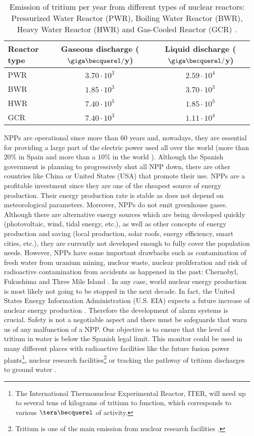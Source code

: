\begin{table}[htbp]
\centering{}%
\begin{tabular}{lcc}
\toprule 
Reactor type & Gaseous discharge ($\giga\becquerel/$y) & Liquid discharge ($\giga\becquerel/$y)\tabularnewline
\midrule
\midrule 
PWR & $3.70\cdot 10^{3}$ & $2.59\cdot 10^{4}$ \tabularnewline
BWR & $1.85\cdot 10^{3}$ & $3.70\cdot 10^{3}$ \tabularnewline
HWR & $7.40\cdot 10^{5}$ & $1.85\cdot 10^{5}$ \tabularnewline
GCR & $7.40\cdot 10^{3}$ & $1.11\cdot 10^{4}$ \tabularnewline
\bottomrule
\end{tabular}
\caption{Emission of tritium per year from different types of nuclear reactors: Pressurized Water Reactor (PWR), Boiling Water Reactor (BWR), Heavy Water Reactor (HWR) and Gas-Cooled Reactor (GCR) \cite{CommonEmissionTritium}.}
\label{tab:TritiumEmisionsNPPs}
\end{table}

NPPs are operational since more than 60 years and, nowadays, they are essential for providing a large part of the electric power used all over the world (more than $20\%$ in Spain \cite{PercentageEnergySpain} and more than a $10\%$ in the world \cite{PercentageEnergyWorld}). Although the Spanish government is planning to progressively shut all NPP down, there are other countries like China \cite{60ReactorsChina} or United States (USA) \cite{35MillionsUSA} that promote their use. NPPs are a profitable investment since they are one of the cheapest source of energy production. Their energy production rate is stable as does not depend on meteorological parameters. Moreover, NPPs do not emit greenhouse gases. Although there are alternative energy sources which are being developed quickly (photovoltaic, wind, tidal energy, etc.), as well as other concepts of energy production and saving (local production, solar roofs, energy efficiency, smart cities, etc.), they are currently not developed enough to fully cover the population needs. However, NPPs have some important drawbacks such as contamination of fresh water from uranium mining, nuclear waste, nuclear proliferation and risk of radioactive contamination from accidents as happened in the past: Chernobyl, Fukushima and Three Mile Island \cite{ThreeMileIsland}. In any case, world nuclear energy production is most likely not going to be stopped in the next decade. In fact, the United States Energy Information Administration (U.S. EIA) expects a future increase of nuclear energy production \cite{EIAOutlook}. Therefore the development of alarm systems is crucial. Safety is not a negotiable aspect and there must be safeguards that warn us of any malfunction of a NPP. Our objective is to ensure that the level of tritium in water is below the Spanish legal limit. This monitor could be used in many different places with radioactive facilities like the future fusion power plants\footnote{The International Thermonuclear Experimental Reactor, ITER, will need up to several tens of kilograms of tritium to function, which corresponds to various $\tera\becquerel$ of activity.}, nuclear research facilities\footnote{Tritium is one of the main emission from nuclear research facilities \cite{FERMILAB, BrookHavenNationalLaboratory}.} or tracking the pathway of tritium discharges to ground water \cite{TrackingTritium}. 


